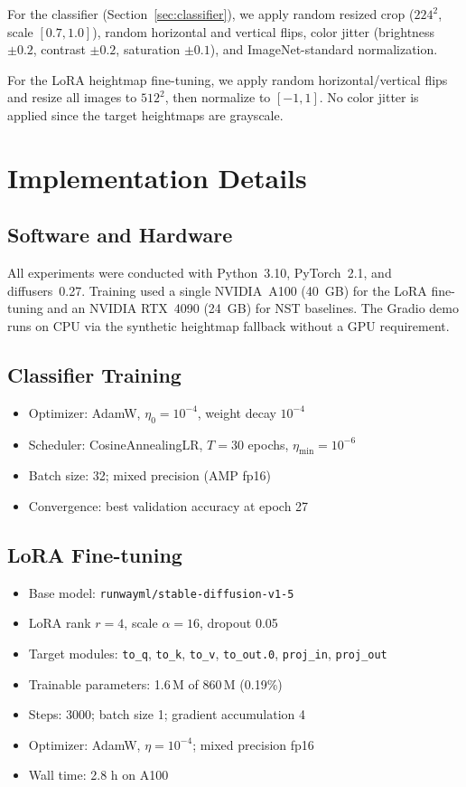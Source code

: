 \documentclass[conference]{IEEEtran}
\begin{document}
For the classifier (Section~\ref{sec:classifier}), we apply random
resized crop ($224^2$, scale $[0.7, 1.0]$), random horizontal and
vertical flips, color jitter (brightness $\pm0.2$, contrast $\pm0.2$,
saturation $\pm0.1$), and ImageNet-standard normalization.

For the LoRA heightmap fine-tuning, we apply random horizontal/vertical
flips and resize all images to $512^2$, then normalize to $[-1,1]$.
No color jitter is applied since the target heightmaps are grayscale.

\section{Implementation Details}

\subsection{Software and Hardware}

All experiments were conducted with Python~3.10, PyTorch~2.1, and
diffusers~0.27. Training used a single NVIDIA~A100 (40~GB) for the LoRA
fine-tuning and an NVIDIA RTX~4090 (24~GB) for NST baselines. The Gradio
demo runs on CPU via the synthetic heightmap fallback without a GPU requirement.

\subsection{Classifier Training}

\begin{itemize}
  \item Optimizer: AdamW, $\eta_0=10^{-4}$, weight decay $10^{-4}$
  \item Scheduler: CosineAnnealingLR, $T=30$ epochs, $\eta_{\min}=10^{-6}$
  \item Batch size: 32; mixed precision (AMP fp16)
  \item Convergence: best validation accuracy at epoch 27
\end{itemize}

\subsection{LoRA Fine-tuning}

\begin{itemize}
  \item Base model: \texttt{runwayml/stable-diffusion-v1-5}
  \item LoRA rank $r=4$, scale $\alpha=16$, dropout 0.05
  \item Target modules: \texttt{to\_q}, \texttt{to\_k}, \texttt{to\_v},
        \texttt{to\_out.0}, \texttt{proj\_in}, \texttt{proj\_out}
  \item Trainable parameters: 1.6\,M of 860\,M (0.19\%)
  \item Steps: 3000; batch size 1; gradient accumulation 4
  \item Optimizer: AdamW, $\eta=10^{-4}$; mixed precision fp16
  \item Wall time: 2.8 h on A100
\end{itemize}
\end{document}
